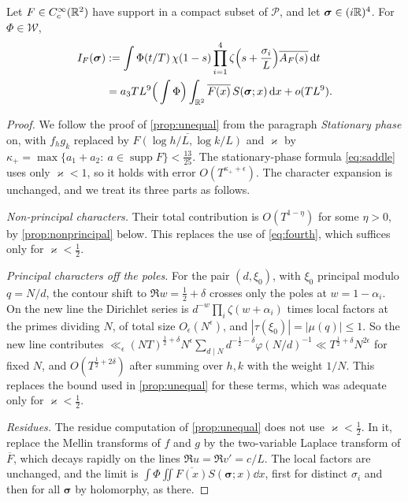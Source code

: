\documentclass[11pt,colorlinks]{charlie}
\begin{document}
\begin{proposition}\label{prop:fourshift}
Let $F\in C_c^\infty(\mathbb{R}^2)$ have support in a compact subset of $\mathcal P$, and let $\boldsymbol\sigma\in(i\mathbb{R})^4$. For $\Phi\in\mathcal W$,
\[
 \begin{split}
 I_F(\boldsymbol\sigma)&:=\int\Phi(t/T)\,\chi(1-s)\prod_{i=1}^4\zeta\Big(s+\frac{\sigma_i}L\Big)\overline{A_F(s)}\,\mathrm{d} t\\
 &=a_3TL^9\Big(\int\Phi\Big)\int_{\mathbb{R}^2}\overline{F(x)}\,S(\boldsymbol\sigma;x)\,\mathrm{d} x+o(TL^9).
 \end{split}
\]
\end{proposition}
\begin{proof}
We follow the proof of \cref{prop:unequal} from the paragraph \emph{Stationary phase} on, with $f_hg_k$ replaced by $\overline{F(\log h/L,\log k/L)}$ and $\varkappa$ by $\kappa_+=\max\{a_1+a_2:\ a\in\operatorname{supp}F\}<\frac{13}{25}$. The stationary-phase formula \eqref{eq:saddle} uses only $\varkappa<1$, so it holds with error $O(T^{\kappa_++\epsilon})$. The character expansion is unchanged, and we treat its three parts as follows.

\emph{Non-principal characters.} Their total contribution is $O(T^{1-\eta})$ for some $\eta>0$, by \cref{prop:nonprincipal} below. This replaces the use of \eqref{eq:fourth}, which suffices only for $\varkappa<\frac12$.

\emph{Principal characters off the poles.} For the pair $(d,\xi_0)$, with $\xi_0$ principal modulo $q=N/d$, the contour shift to $\Re w=\frac12+\delta$ crosses only the poles at $w=1-\alpha_i$. On the new line the Dirichlet series is $d^{-w}\prod_i\zeta(w+\alpha_i)$ times local factors at the primes dividing $N$, of total size $O_\epsilon(N^\epsilon)$, and $|\tau(\xi_0)|=|\mu(q)|\le1$. So the new line contributes $\ll_\epsilon(NT)^{\frac12+\delta}N^\epsilon\sum_{d\mid N}d^{-\frac12-\delta}\varphi(N/d)^{-1}\ll T^{\frac12+\delta}N^{2\epsilon}$ for fixed $N$, and $O(T^{\frac12+2\delta})$ after summing over $h,k$ with the weight $1/N$. This replaces the bound used in \cref{prop:unequal} for these terms, which was adequate only for $\varkappa<\frac12$.

\emph{Residues.} The residue computation of \cref{prop:unequal} does not use $\varkappa<\frac12$. In it, replace the Mellin transforms of $f$ and $g$ by the two-variable Laplace transform of $\overline F$, which decays rapidly on the lines $\Re u=\Re v'=c/L$. The local factors are unchanged, and the limit is $\int\Phi\iint\overline{F(x)}S(\boldsymbol\sigma;x)\dd x$, first for distinct $\sigma_i$ and then for all $\boldsymbol\sigma$ by holomorphy, as there.
\end{proof}
\end{document}

